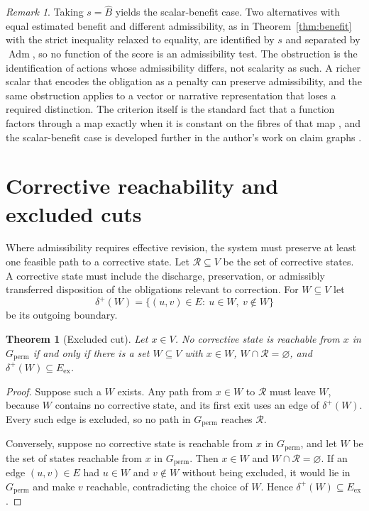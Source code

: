 \documentclass[11pt]{article}
\newtheorem{theorem}{Theorem}
\theoremstyle{definition}
\theoremstyle{remark}
\newtheorem{remark}{Remark}
\newcommand{\Adm}{\operatorname{Adm}}
\begin{document}
\begin{remark}
Taking $s=\widehat B$ yields the scalar-benefit case. Two alternatives with equal estimated benefit and different admissibility, as in Theorem~\ref{thm:benefit} with the strict inequality relaxed to equality, are identified by $s$ and separated by $\Adm$, so no function of the score is an admissibility test. The obstruction is the identification of actions whose admissibility differs, not scalarity as such. A richer scalar that encodes the obligation as a penalty can preserve admissibility, and the same obstruction applies to a vector or narrative representation that loses a required distinction. The criterion itself is the standard fact that a function factors through a map exactly when it is constant on the fibres of that map \cite{maclane1998}, and the scalar-benefit case is developed further in the author's work on claim graphs \cite{flyxionAdversaria}.
\end{remark}

\section{Corrective reachability and excluded cuts}\label{sec:cut}

Where admissibility requires effective revision, the system must preserve at least one feasible path to a corrective state. Let $\mathcal R\subseteq V$ be the set of corrective states. A corrective state must include the discharge, preservation, or admissibly transferred disposition of the obligations relevant to correction. For $W\subseteq V$ let
\[
\delta^+(W)=\{(u,v)\in E:\ u\in W,\ v\notin W\}
\]
be its outgoing boundary.

\begin{theorem}[Excluded cut]\label{thm:cut}
Let $x\in V$. No corrective state is reachable from $x$ in $G_{\mathrm{perm}}$ if and only if there is a set $W\subseteq V$ with $x\in W$, $W\cap\mathcal R=\varnothing$, and $\delta^+(W)\subseteq E_{\mathrm{ex}}$.
\end{theorem}
\begin{proof}
Suppose such a $W$ exists. Any path from $x\in W$ to $\mathcal R$ must leave $W$, because $W$ contains no corrective state, and its first exit uses an edge of $\delta^+(W)$. Every such edge is excluded, so no path in $G_{\mathrm{perm}}$ reaches $\mathcal R$.

Conversely, suppose no corrective state is reachable from $x$ in $G_{\mathrm{perm}}$, and let $W$ be the set of states reachable from $x$ in $G_{\mathrm{perm}}$. Then $x\in W$ and $W\cap\mathcal R=\varnothing$. If an edge $(u,v)\in E$ had $u\in W$ and $v\notin W$ without being excluded, it would lie in $G_{\mathrm{perm}}$ and make $v$ reachable, contradicting the choice of $W$. Hence $\delta^+(W)\subseteq E_{\mathrm{ex}}$. \qedhere
\end{proof}
\end{document}
